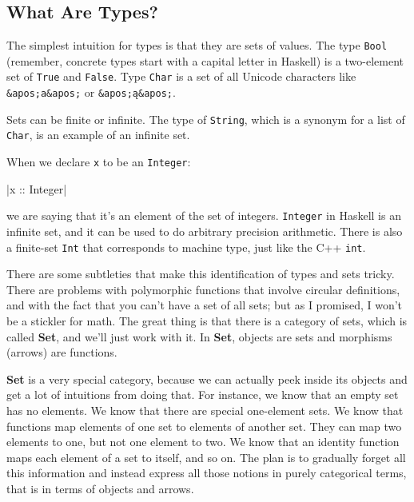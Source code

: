 \subsection{What Are Types?}\label{what-are-types}

The simplest intuition for types is that they are sets of values. The
type \texttt{Bool} (remember, concrete types start with a capital letter
in Haskell) is a two-element set of \texttt{True} and \texttt{False}.
Type \texttt{Char} is a set of all Unicode characters like
\texttt{\&apos;a\&apos;} or \texttt{\&apos;ą\&apos;}.

Sets can be finite or infinite. The type of \texttt{String}, which is a
synonym for a list of \texttt{Char}, is an example of an infinite set.

When we declare \texttt{x} to be an \texttt{Integer}:

|x :: Integer|

we are saying that it's an element of the set of integers.
\texttt{Integer} in Haskell is an infinite set, and it can be used to do
arbitrary precision arithmetic. There is also a finite-set \texttt{Int}
that corresponds to machine type, just like the C++ \texttt{int}.

There are some subtleties that make this identification of types and
sets tricky. There are problems with polymorphic functions that involve
circular definitions, and with the fact that you can't have a set of all
sets; but as I promised, I won't be a stickler for math. The great thing
is that there is a category of sets, which is called \textbf{Set}, and
we'll just work with it. In \textbf{Set}, objects are sets and morphisms
(arrows) are functions.

\textbf{Set} is a very special category, because we can actually peek
inside its objects and get a lot of intuitions from doing that. For
instance, we know that an empty set has no elements. We know that there
are special one-element sets. We know that functions map elements of one
set to elements of another set. They can map two elements to one, but
not one element to two. We know that an identity function maps each
element of a set to itself, and so on. The plan is to gradually forget
all this information and instead express all those notions in purely
categorical terms, that is in terms of objects and arrows.

